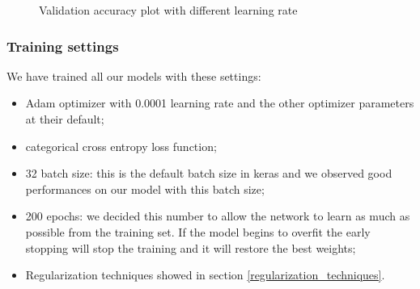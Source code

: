 			\begin{figure}[!h] 
				\hspace*{\fill}
				\hspace*{\fill}
				\caption{Validation accuracy plot with different learning rate}
				\label{fig:val_acc_lr}
			\end{figure}
			
		\subsubsection{Training settings} \label{training_settings}
		
			We have trained all our models with these settings:
			\begin{itemize}
				\item Adam optimizer with 0.0001 learning rate and the other optimizer parameters at their default;
				\item categorical cross entropy loss function;
				\item 32 batch size: this is the default batch size in keras and we observed good performances on our model with this batch size;
				\item 200 epochs: we decided this number to allow the network to learn as much as possible from the training set. If the model begins to overfit the early stopping will stop the training and it will restore the best weights;
				\item Regularization techniques showed in section \ref{regularization_techniques}.
			\end{itemize}	
			
			
		
		
		
		
		
		
		